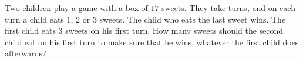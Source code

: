 Two children play a game with a box of $17$ sweets. They take turns, and on each turn a child eats $1$, $2$ or $3$ sweets. The child who eats the last sweet wins. The first child eats $3$ sweets on his first turn. How many sweets should the second child eat on his first turn to make sure that he wins, whatever the first child does afterwards?

